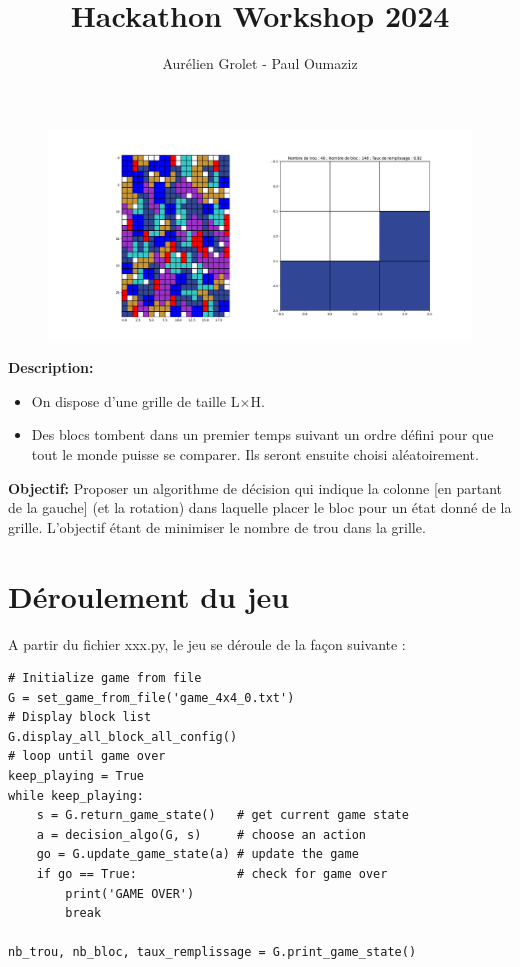\documentclass[10pt,a4paper]{article}
\title{Hackathon Workshop 2024}
\author{Aurélien Grolet - Paul Oumaziz}
\begin{document}
\begin{figure}[ht!]
	\centering
	\includegraphics[width=\textwidth]{exemple_grille.pdf}
\end{figure}

\noindent\textbf{Description:}
\begin{itemize}
	\item On dispose d'une grille de taille L$\times$H.
	\item Des blocs tombent dans un premier temps suivant un ordre défini pour que tout le monde puisse se comparer. Ils seront ensuite choisi aléatoirement.
\end{itemize}
\medskip



\noindent\textbf{Objectif:} Proposer un algorithme de décision qui indique la colonne [en partant de la gauche] (et la rotation) dans laquelle placer le bloc pour un état donné de la grille. L'objectif étant de minimiser le nombre de trou dans la grille.

\section*{Déroulement du jeu}

A partir du fichier xxx.py, le jeu se déroule de la façon suivante :

\begin{verbatim}
# Initialize game from file
G = set_game_from_file('game_4x4_0.txt')
# Display block list
G.display_all_block_all_config()
# loop until game over
keep_playing = True
while keep_playing:
	s = G.return_game_state()   # get current game state
	a = decision_algo(G, s)     # choose an action
	go = G.update_game_state(a) # update the game
	if go == True:              # check for game over
		print('GAME OVER')
		break

nb_trou, nb_bloc, taux_remplissage = G.print_game_state()
\end{verbatim}
\end{document}
